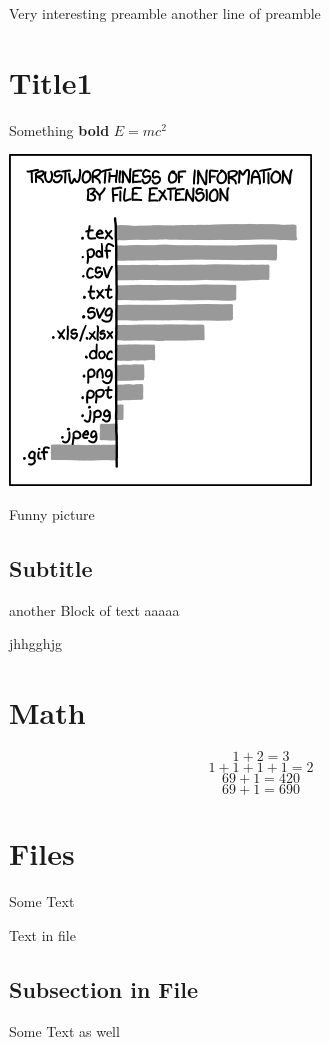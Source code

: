 Very interesting preamble
another line of preamble

\section{Title1}
Something \textbf{bold}
$E = mc^2$

\includegraphics{image.png}
\caption{Funny picture}
\subsection{Subtitle}
another Block of text
aaaaa

jhhgghjg

\section{Math}
\label{math}
$$1+2 = 3$$
\[1+1+1+1=2\]
\begin{displaymath}
69 + 1 = 420
\end{displaymath}
\begin{equation}
69 + 1 = 690
\end{equation}
\section{Files}
Some Text

Text in file

\subsection{Subsection in File}
Some Text as well

